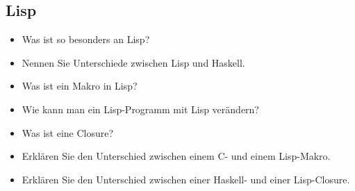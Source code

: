 \documentclass[
  a4paper,
  11pt,
]{article}
\begin{document}
\subsection*{Lisp}
\label{sub:Lisp}

\begin{itemize}
  \item Was ist so besonders an Lisp?
  \item Nennen Sie Unterschiede zwischen Lisp und Haskell.
  \item Was ist ein Makro in Lisp?
  \item Wie kann man ein Lisp-Programm mit Lisp verändern?
  \item Was ist eine Closure?
  \item Erklären Sie den Unterschied zwischen einem C- und einem Lisp-Makro.
  \item Erklären Sie den Unterschied zwischen einer Haskell- und einer
    Lisp-Closure.
\end{itemize}
\end{document}
